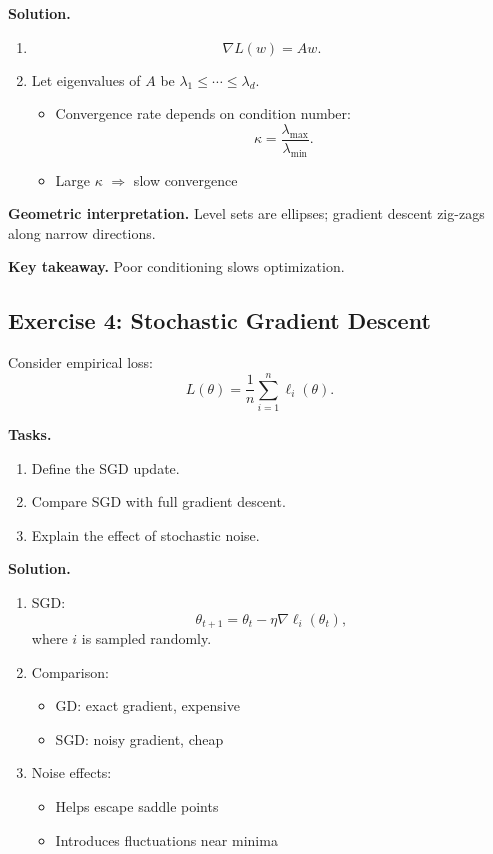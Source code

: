 \medskip

\noindent
\textbf{Solution.}

\begin{enumerate}
\item 
\[
\nabla L(w) = A w.
\]

\item Let eigenvalues of $A$ be $\lambda_1 \leq \cdots \leq \lambda_d$.

\begin{itemize}
    \item Convergence rate depends on condition number:
    \[
    \kappa = \frac{\lambda_{\max}}{\lambda_{\min}}.
    \]
    \item Large $\kappa$ $\Rightarrow$ slow convergence
\end{itemize}
\end{enumerate}

\medskip

\noindent
\textbf{Geometric interpretation.}  
Level sets are ellipses; gradient descent zig-zags along narrow directions.

\medskip

\noindent
\textbf{Key takeaway.}  
Poor conditioning slows optimization.

\subsection{Exercise 4: Stochastic Gradient Descent}

Consider empirical loss:
\[
L(\theta) = \frac{1}{n} \sum_{i=1}^n \ell_i(\theta).
\]

\medskip

\noindent
\textbf{Tasks.}
\begin{enumerate}
    \item Define the SGD update.
    \item Compare SGD with full gradient descent.
    \item Explain the effect of stochastic noise.
\end{enumerate}

\medskip

\noindent
\textbf{Solution.}

\begin{enumerate}
\item SGD:
\[
\theta_{t+1} = \theta_t - \eta \nabla \ell_i(\theta_t),
\]
where $i$ is sampled randomly.

\item Comparison:
\begin{itemize}
    \item GD: exact gradient, expensive
    \item SGD: noisy gradient, cheap
\end{itemize}

\item Noise effects:
\begin{itemize}
    \item Helps escape saddle points
    \item Introduces fluctuations near minima
\end{itemize}
\end{enumerate}

